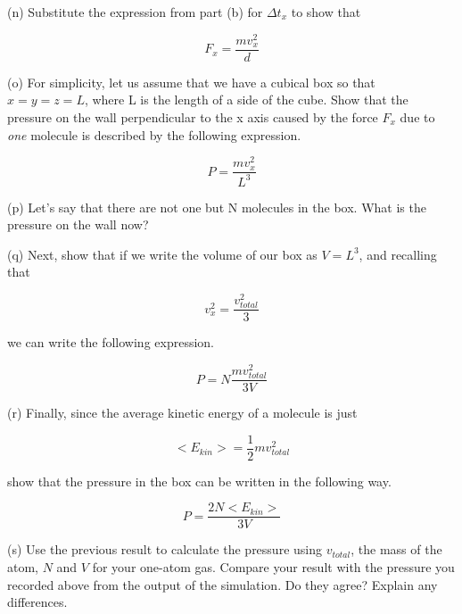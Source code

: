 (n) Substitute the expression from part (b) for \( \Delta t_{x} \)
to show that 

\[
F_{x}=\frac{mv_{x}^{2}}{d}\]

\vspace{20mm}

(o) For simplicity, let us assume that we have a cubical box so that
\( x=y=z=L \), where L is the length of a side of the cube. Show
that the pressure on the wall perpendicular to the x axis caused by
the force \( F_{x} \) due to \emph{one} molecule is described by
the following expression.

\[
P=\frac{mv_{x}^{2}}{L^{3}}\]

\vspace{20mm}

(p) Let's say that there are not one but N molecules in the box. What
is the pressure on the wall now?
\vspace{20mm}

(q) Next, show that if we write the volume of our box as \( V=L^{3} \),
and recalling that

\[
v_{x}^{2}=\frac{v_{total}^{2}}{3}\]


we can write the following expression.

\[
P=N\frac{mv_{total}^{2}}{3V}\]

\vspace{20mm}

(r) Finally, since the average kinetic energy of a molecule is just

\[
<E_{kin}>=\frac{1}{2}mv_{total}^{2}\]


show that the pressure in the box can be written in the following
way.

\[
P=\frac{2N<E_{kin}>}{3V}\]
\vspace{20mm}

(s) Use the previous result to calculate the pressure using $v_{total}$, the mass of the
atom, $N$ and $V$ for your one-atom gas. Compare your result with the pressure you recorded above from the
output of the simulation.
Do they agree?
Explain any differences.
\vspace{20mm}
